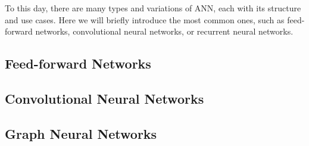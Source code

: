 
To this day, there are many types and variations of ANN, each with its structure and use cases. Here we will briefly introduce the most common ones, such as feed-forward networks, convolutional neural networks, or recurrent neural networks.

\subsection{Feed-forward Networks}

\subsection{Convolutional Neural Networks}

%
%
\subsection{Graph Neural Networks}

